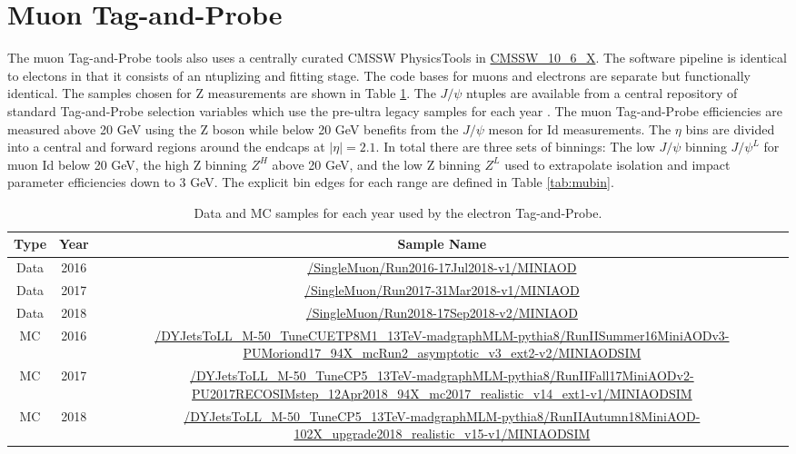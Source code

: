 \section{Muon Tag-and-Probe}
The muon Tag-and-Probe tools also uses a centrally curated CMSSW PhysicsTools in \url{CMSSW_10_6_X}. The software pipeline is identical to electons in that it consists of an ntuplizing \cite{MuTnPTwiki} and fitting \cite{MuTnPAnaTwiki} stage. The code bases for muons and electrons are separate but functionally identical. The samples chosen for Z measurements are shown in Table \ref{tab:mutnpsamples}. The $J/\psi$ ntuples are available from a central repository of standard Tag-and-Probe selection variables which use the pre-ultra legacy samples for each year \cite{MuTnPCentralSamps}.  The muon Tag-and-Probe efficiencies are measured above 20 GeV using the Z boson while below 20 GeV benefits from the $J/\psi$ meson for Id measurements. The $\eta$ bins are divided into a central and forward regions around the endcaps at $|\eta| = 2.1$. In total there are three sets of binnings: The low \pt $J/\psi$ binning $J/\psi^{L}$ for muon Id below 20 GeV, the high \pt Z binning $Z^{H}$ above 20 GeV, and the low \pt Z binning $Z^{L}$ used to extrapolate isolation and impact parameter efficiencies down to 3 GeV.  The explicit bin edges for each range are defined in Table \ref{tab:mubin}.


\begin{table}
\caption{Data and MC samples for each year used by the electron Tag-and-Probe.}
\label{tab:mutnpsamples}
\scriptsize
\begin{adjustwidth}{-0.5in}{-1in}
\begin{tabular}{cc|c}
\hline 
Type & Year & Sample Name \\ 
\hline 
\hline
Data & 2016 & \tiny \url{/SingleMuon/Run2016-17Jul2018-v1/MINIAOD}  \\  
Data & 2017 & \tiny \url{/SingleMuon/Run2017-31Mar2018-v1/MINIAOD} \\  
Data & 2018 & \tiny \url{/SingleMuon/Run2018-17Sep2018-v2/MINIAOD} \\ 
\hline 
MC & 2016 & \tiny \url{/DYJetsToLL_M-50_TuneCUETP8M1_13TeV-madgraphMLM-pythia8/RunIISummer16MiniAODv3-PUMoriond17_94X_mcRun2_asymptotic_v3_ext2-v2/MINIAODSIM} \\ 
MC & 2017 & \tiny \url{/DYJetsToLL_M-50_TuneCP5_13TeV-madgraphMLM-pythia8/RunIIFall17MiniAODv2-PU2017RECOSIMstep_12Apr2018_94X_mc2017_realistic_v14_ext1-v1/MINIAODSIM} \\ 
MC & 2018 & \tiny \url{/DYJetsToLL_M-50_TuneCP5_13TeV-madgraphMLM-pythia8/RunIIAutumn18MiniAOD-102X_upgrade2018_realistic_v15-v1/MINIAODSIM} \\ 
\hline
\end{tabular} 
\end{adjustwidth}
\end{table}


